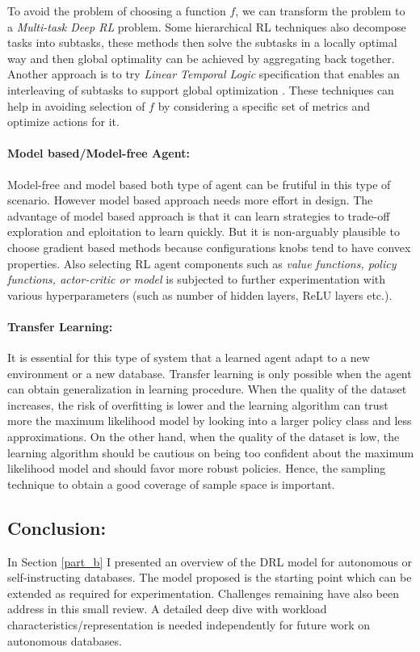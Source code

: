 To avoid the problem of choosing a function $f$, we can transform the problem to a {\em Multi-task Deep RL} problem.
Some hierarchical RL techniques also decompose tasks into subtasks, these methods then solve the subtasks
in a locally optimal way and then global optimality can be achieved by aggregating back together. Another approach is to try {\em Linear Temporal Logic} specification that enables an interleaving of subtasks to support global optimization \cite{icarte2018teaching}.
These techniques can help in avoiding selection of $f$ by considering a specific set of metrics and optimize actions for it.


\paragraph{Model based/Model-free Agent:}
Model-free and model based both type of agent can be frutiful in this type of scenario. However model based approach needs more effort in design.
The advantage of model based approach is that it can learn strategies to trade-off exploration and eploitation to learn quickly.
But it is non-arguably plausible to choose gradient based methods because configurations knobs tend to have convex properties.
Also selecting RL agent components such as {\em value functions, policy functions, actor-critic or model} is subjected to further experimentation with various hyperparameters (such as number of hidden layers, ReLU layers etc.).

\paragraph{Transfer Learning:}
It is essential for this type of system that a learned agent adapt to a new environment or a new database.
Transfer learning is only possible when the agent can obtain generalization in learning procedure.
When the quality
of the dataset increases, the risk of overfitting is lower and the learning
algorithm can trust more the maximum likelihood model by looking
into a larger policy class and less approximations.
On the other hand, when the quality of the dataset is low, the learning algorithm should be
cautious on being too confident about the maximum likelihood model
and should favor more robust policies. Hence, the sampling technique to obtain a good coverage of sample space is important.


\subsection{Conclusion:}
In Section \ref{part_b} I presented an overview of the DRL model for autonomous or self-instructing databases. The model proposed is the starting point which can be extended as required for experimentation.  Challenges remaining have also been address in this small review.
A detailed deep dive with workload characteristics/representation is needed independently for future work on autonomous databases.








